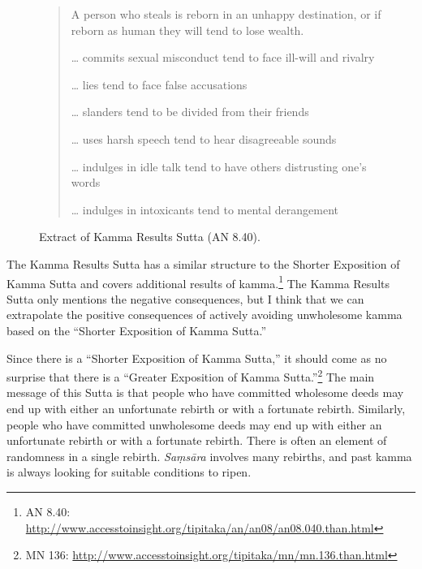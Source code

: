 \begin{figure}[H]
\begin{quotation}
A person who steals is reborn in an unhappy destination, or if reborn as human they will tend to lose wealth.

… commits sexual misconduct \textrightarrow \hspace{1mm} tend to face ill-will and rivalry

… lies \textrightarrow \hspace{1mm} tend to face false accusations

… slanders \textrightarrow \hspace{1mm} tend to be divided from their friends

… uses harsh speech \textrightarrow \hspace{1mm} tend to hear disagreeable sounds

… indulges in idle talk \textrightarrow \hspace{1mm} tend to have others distrusting one’s words

… indulges in intoxicants \textrightarrow \hspace{1mm} tend to mental derangement
\end{quotation}
\caption{Extract of Kamma Results Sutta (AN 8.40).}
\label{fig:AN8_40}
\end{figure}

The Kamma Results Sutta has a similar structure to the Shorter Exposition of Kamma Sutta and covers additional results of kamma.\footnote{AN 8.40: \url{http://www.accesstoinsight.org/tipitaka/an/an08/an08.040.than.html}} The Kamma Results Sutta only mentions the negative consequences, but I think that we can extrapolate the positive consequences of actively avoiding unwholesome kamma based on the “Shorter Exposition of Kamma Sutta.”

Since there is a “Shorter Exposition of Kamma Sutta,” it should come as no surprise that there is a “Greater Exposition of Kamma Sutta.”\footnote{MN 136: \url{http://www.accesstoinsight.org/tipitaka/mn/mn.136.than.html}} The main message of this Sutta is that people who have committed wholesome deeds may end up with either an unfortunate rebirth or with a fortunate rebirth. Similarly, people who have committed unwholesome deeds may end up with either an unfortunate rebirth or with a fortunate rebirth. There is often an element of randomness in a single rebirth. \textit{Saṃsāra} involves many rebirths, and past kamma is always looking for suitable conditions to ripen.

